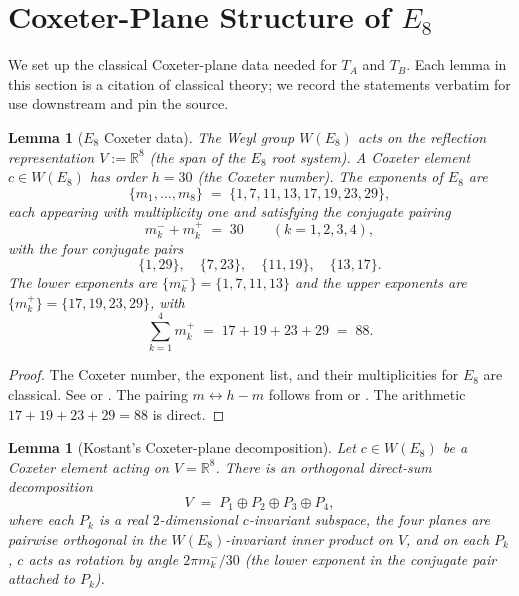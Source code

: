 \documentclass[11pt, a4paper]{amsart}
\newtheorem{lemma}[theorem]{Lemma}
\theoremstyle{definition}
\newcommand{\R}{\mathbb{R}}
\begin{document}
\section{Coxeter-Plane Structure of $E_8$}
\label{sec:cox-data}

We set up the classical Coxeter-plane data needed for
$T_A$ and $T_B$. Each lemma in this section is a citation of
classical theory; we record the statements verbatim for use
downstream and pin the source.

\begin{lemma}[$E_8$ Coxeter data]
\label{lem:E8-data}
The Weyl group $W(E_8)$ acts on the reflection representation
$V := \R^8$ (the span of the $E_8$ root system). A Coxeter
element $c \in W(E_8)$ has order $h = 30$ (the Coxeter number).
The exponents of $E_8$ are
\[
  \{m_1, \ldots, m_8\}
  \;=\; \{1, 7, 11, 13, 17, 19, 23, 29\},
\]
each appearing with multiplicity one and satisfying the
conjugate pairing
\[
  m_k^- + m_k^+ \;=\; 30
  \qquad(k = 1, 2, 3, 4),
\]
with the four conjugate pairs
\[
  \{1, 29\}, \quad \{7, 23\}, \quad \{11, 19\}, \quad \{13, 17\}.
\]
The lower exponents are
$\{m_k^-\} = \{1, 7, 11, 13\}$ and the upper exponents are
$\{m_k^+\} = \{17, 19, 23, 29\}$, with
\[
  \sum_{k=1}^{4} m_k^+ \;=\; 17 + 19 + 23 + 29 \;=\; 88.
\]
\end{lemma}

\begin{proof}
The Coxeter number, the exponent list, and their multiplicities
for $E_8$ are classical. See
\cite[Ch.~6, \S4 No.~12, Planche~VII (the table for $E_8$)]{Bourbaki46}
or \cite[\S 3.18 (Coxeter number) and \S 3.19 (exponents)
together with the table in \S 3.7 for $E_8$]{Humphreys}.
The pairing $m \leftrightarrow h - m$ follows from
\cite[Ch.~5, \S6 No.~2, Cor.~2 (the symmetry of exponents
about $h/2$)]{Bourbaki46} or
\cite[Thm.~3.18 and Cor.~3.20]{Humphreys}.
The arithmetic $17 + 19 + 23 + 29 = 88$ is direct.
\end{proof}

\begin{lemma}[Kostant's Coxeter-plane decomposition]
\label{lem:cox-plane}
Let $c \in W(E_8)$ be a Coxeter element acting on $V = \R^8$.
There is an orthogonal direct-sum decomposition
\[
  V \;=\; P_1 \oplus P_2 \oplus P_3 \oplus P_4,
\]
where each $P_k$ is a real $2$-dimensional $c$-invariant
subspace, the four planes are pairwise orthogonal in the
$W(E_8)$-invariant inner product on $V$, and on each $P_k$,
$c$ acts as rotation by angle $2\pi m_k^- / 30$ (the lower
exponent in the conjugate pair attached to $P_k$).
\end{lemma}
\end{document}
